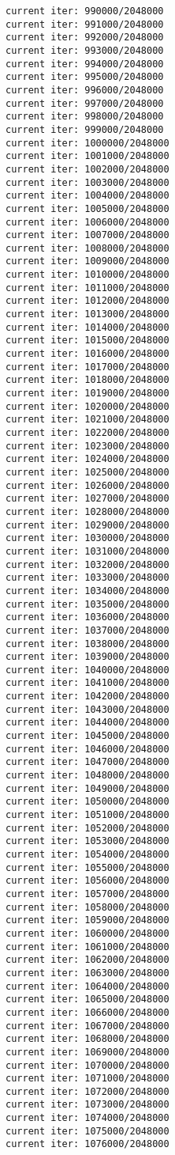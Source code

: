 \documentclass[11pt]{article}
\begin{document}
\begin{Verbatim}[commandchars=\\\{\}]
current iter: 990000/2048000
current iter: 991000/2048000
current iter: 992000/2048000
current iter: 993000/2048000
current iter: 994000/2048000
current iter: 995000/2048000
current iter: 996000/2048000
current iter: 997000/2048000
current iter: 998000/2048000
current iter: 999000/2048000
current iter: 1000000/2048000
current iter: 1001000/2048000
current iter: 1002000/2048000
current iter: 1003000/2048000
current iter: 1004000/2048000
current iter: 1005000/2048000
current iter: 1006000/2048000
current iter: 1007000/2048000
current iter: 1008000/2048000
current iter: 1009000/2048000
current iter: 1010000/2048000
current iter: 1011000/2048000
current iter: 1012000/2048000
current iter: 1013000/2048000
current iter: 1014000/2048000
current iter: 1015000/2048000
current iter: 1016000/2048000
current iter: 1017000/2048000
current iter: 1018000/2048000
current iter: 1019000/2048000
current iter: 1020000/2048000
current iter: 1021000/2048000
current iter: 1022000/2048000
current iter: 1023000/2048000
current iter: 1024000/2048000
current iter: 1025000/2048000
current iter: 1026000/2048000
current iter: 1027000/2048000
current iter: 1028000/2048000
current iter: 1029000/2048000
current iter: 1030000/2048000
current iter: 1031000/2048000
current iter: 1032000/2048000
current iter: 1033000/2048000
current iter: 1034000/2048000
current iter: 1035000/2048000
current iter: 1036000/2048000
current iter: 1037000/2048000
current iter: 1038000/2048000
current iter: 1039000/2048000
current iter: 1040000/2048000
current iter: 1041000/2048000
current iter: 1042000/2048000
current iter: 1043000/2048000
current iter: 1044000/2048000
current iter: 1045000/2048000
current iter: 1046000/2048000
current iter: 1047000/2048000
current iter: 1048000/2048000
current iter: 1049000/2048000
current iter: 1050000/2048000
current iter: 1051000/2048000
current iter: 1052000/2048000
current iter: 1053000/2048000
current iter: 1054000/2048000
current iter: 1055000/2048000
current iter: 1056000/2048000
current iter: 1057000/2048000
current iter: 1058000/2048000
current iter: 1059000/2048000
current iter: 1060000/2048000
current iter: 1061000/2048000
current iter: 1062000/2048000
current iter: 1063000/2048000
current iter: 1064000/2048000
current iter: 1065000/2048000
current iter: 1066000/2048000
current iter: 1067000/2048000
current iter: 1068000/2048000
current iter: 1069000/2048000
current iter: 1070000/2048000
current iter: 1071000/2048000
current iter: 1072000/2048000
current iter: 1073000/2048000
current iter: 1074000/2048000
current iter: 1075000/2048000
current iter: 1076000/2048000

\end{Verbatim}
\end{document}
